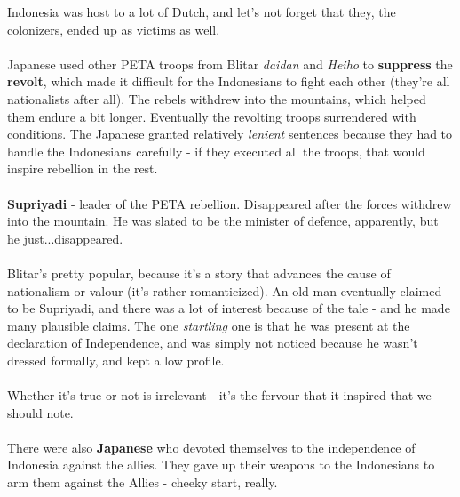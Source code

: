 \documentclass[a4paper]{article}
\begin{document}
Indonesia was host to a lot of Dutch, and let's not forget that they, the colonizers, ended up as victims as well.\\
\\
Japanese used other PETA troops from Blitar \textit{daidan} and \textit{Heiho} to \textbf{suppress} the \textbf{revolt}, which made it difficult for the Indonesians to fight each other (they're all nationalists after all). The rebels withdrew into the mountains, which helped them endure a bit longer. Eventually the revolting troops surrendered with conditions. The Japanese granted relatively \textit{lenient} sentences because they had to handle the Indonesians carefully - if they executed all the troops, that would inspire rebellion in the rest.\\
\\
\textbf{Supriyadi} - leader of the PETA rebellion. Disappeared after the forces withdrew into the mountain. He was slated to be the minister of defence, apparently, but he just...disappeared.\\
\\
Blitar's pretty popular, because it's a story that advances the cause of nationalism or valour (it's rather romanticized). An old man eventually claimed to be Supriyadi, and there was a lot of interest because of the tale - and he made many plausible claims. The one \textit{startling} one is that he was present at the declaration of Independence, and was simply not noticed because he wasn't dressed formally, and kept a low profile.\\
\\
Whether it's true or not is irrelevant - it's the fervour that it inspired that we should note.\\
\\
There were also \textbf{Japanese} who devoted themselves to the independence of Indonesia against the allies. They gave up their weapons to the Indonesians to arm them against the Allies - cheeky start, really.
\end{document}
